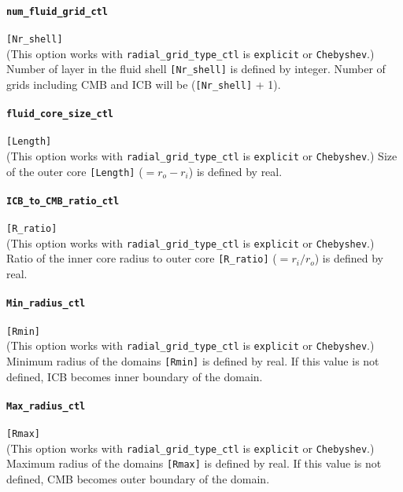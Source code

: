 \paragraph{\tt num\_fluid\_grid\_ctl}
\label{href_t:num_fluid_grid_ctl}
\verb|[Nr_shell]| \\
(This option works with \verb|radial_grid_type_ctl| is {\tt explicit} or {\tt Chebyshev}.)
Number of layer in the fluid shell \verb|[Nr_shell]| is defined by integer. Number of grids including CMB and ICB will be (\verb|[Nr_shell]| + 1).

\paragraph{\tt fluid\_core\_size\_ctl}
\label{href_t:fluid_core_size_ctl}
\verb|[Length]| \\
(This option works with \verb|radial_grid_type_ctl| is {\tt explicit} or {\tt Chebyshev}.)
Size of the outer core \verb|[Length]| ($ = r_{o}-r_{i}$) is defined by real.

\paragraph{\tt ICB\_to\_CMB\_ratio\_ctl}
\label{href_t:ICB_to_CMB_ratio_ctl} 
\verb|[R_ratio]| \\
(This option works with \verb|radial_grid_type_ctl| is {\tt explicit} or {\tt Chebyshev}.)
Ratio of the inner core radius to outer core \verb|[R_ratio]| ($ = r_{i} / r_{o}$) is defined by real.

\paragraph{\tt Min\_radius\_ctl}
\label{href_t:Min_radius_ctl}
\verb|[Rmin]| \\
(This option works with \verb|radial_grid_type_ctl| is {\tt explicit} or {\tt Chebyshev}.)
Minimum radius of the domains \verb|[Rmin]| is defined by real. If this value is not defined, ICB becomes inner boundary of the domain.

\paragraph{\tt Max\_radius\_ctl }
\label{href_t:Max_radius_ctl} 
\verb|[Rmax]| \\
(This option works with \verb|radial_grid_type_ctl| is {\tt explicit} or {\tt Chebyshev}.)
Maximum radius of the domains \verb|[Rmax]| is defined by real. If this value is not defined, CMB becomes outer boundary of the domain.

